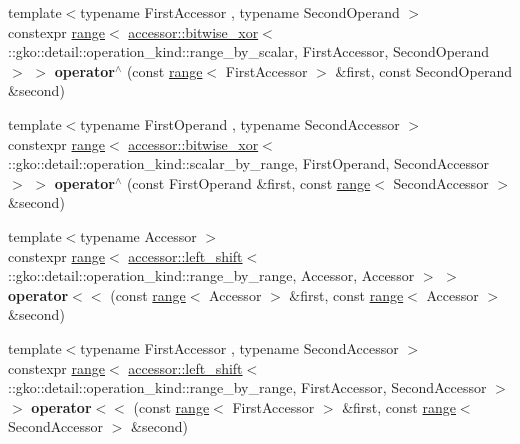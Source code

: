 \begin{DoxyCompactItemize}
\item 
\mbox{\label{namespacegko_afa4929c556ad4f2690b9c8aeaf2cea4f}} 
{\footnotesize template$<$typename First\+Accessor , typename Second\+Operand $>$ }\\constexpr \hyperlink{classgko_1_1range}{range}$<$ \hyperlink{structgko_1_1accessor_1_1bitwise__xor}{accessor\+::bitwise\+\_\+xor}$<$ \+::gko\+::detail\+::operation\+\_\+kind\+::range\+\_\+by\+\_\+scalar, First\+Accessor, Second\+Operand $>$ $>$ {\bfseries operator$^\wedge$} (const \hyperlink{classgko_1_1range}{range}$<$ First\+Accessor $>$ \&first, const Second\+Operand \&second)
\item 
\mbox{\label{namespacegko_a110b727befb8ac474ece75ac62ae6668}} 
{\footnotesize template$<$typename First\+Operand , typename Second\+Accessor $>$ }\\constexpr \hyperlink{classgko_1_1range}{range}$<$ \hyperlink{structgko_1_1accessor_1_1bitwise__xor}{accessor\+::bitwise\+\_\+xor}$<$ \+::gko\+::detail\+::operation\+\_\+kind\+::scalar\+\_\+by\+\_\+range, First\+Operand, Second\+Accessor $>$ $>$ {\bfseries operator$^\wedge$} (const First\+Operand \&first, const \hyperlink{classgko_1_1range}{range}$<$ Second\+Accessor $>$ \&second)
\item 
\mbox{\label{namespacegko_a3a0fb3b3ff225d07950e27943d29593f}} 
{\footnotesize template$<$typename Accessor $>$ }\\constexpr \hyperlink{classgko_1_1range}{range}$<$ \hyperlink{structgko_1_1accessor_1_1left__shift}{accessor\+::left\+\_\+shift}$<$ \+::gko\+::detail\+::operation\+\_\+kind\+::range\+\_\+by\+\_\+range, Accessor, Accessor $>$ $>$ {\bfseries operator$<$$<$} (const \hyperlink{classgko_1_1range}{range}$<$ Accessor $>$ \&first, const \hyperlink{classgko_1_1range}{range}$<$ Accessor $>$ \&second)
\item 
\mbox{\label{namespacegko_a6d7500d198bc217d251346560148657e}} 
{\footnotesize template$<$typename First\+Accessor , typename Second\+Accessor $>$ }\\constexpr \hyperlink{classgko_1_1range}{range}$<$ \hyperlink{structgko_1_1accessor_1_1left__shift}{accessor\+::left\+\_\+shift}$<$ \+::gko\+::detail\+::operation\+\_\+kind\+::range\+\_\+by\+\_\+range, First\+Accessor, Second\+Accessor $>$ $>$ {\bfseries operator$<$$<$} (const \hyperlink{classgko_1_1range}{range}$<$ First\+Accessor $>$ \&first, const \hyperlink{classgko_1_1range}{range}$<$ Second\+Accessor $>$ \&second)

\end{DoxyCompactItemize}
